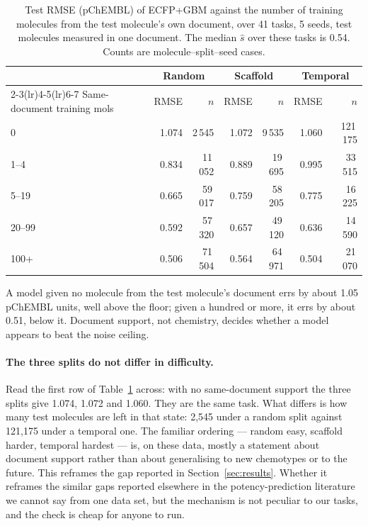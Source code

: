 \begin{table}[t]
\centering\small
\caption{Test RMSE (pChEMBL) of ECFP+GBM against the number of training molecules from the test molecule's own document, over 41 tasks, 5 seeds, test molecules measured in one document. The median $\hat s$ over these tasks is 0.54. Counts are molecule--split--seed cases.}
\label{tab:support}
\begin{tabular}{lrrrrrr}
\toprule
& \multicolumn{2}{c}{Random} & \multicolumn{2}{c}{Scaffold} & \multicolumn{2}{c}{Temporal} \\
\cmidrule(lr){2-3}\cmidrule(lr){4-5}\cmidrule(lr){6-7}
Same-document training mols & RMSE & $n$ & RMSE & $n$ & RMSE & $n$ \\
\midrule
0        & 1.074 & 2\,545  & 1.072 & 9\,535  & 1.060 & 121\,175 \\
1--4     & 0.834 & 11\,052 & 0.889 & 19\,695 & 0.995 & 33\,515 \\
5--19    & 0.665 & 59\,017 & 0.759 & 58\,205 & 0.775 & 16\,225 \\
20--99   & 0.592 & 57\,320 & 0.657 & 49\,120 & 0.636 & 14\,590 \\
100+     & 0.506 & 71\,504 & 0.564 & 64\,971 & 0.504 & 21\,070 \\
\bottomrule
\end{tabular}
\end{table}

A model given no molecule from the test molecule's document errs by about 1.05 pChEMBL units, well above the floor; given a hundred or more, it errs by about 0.51, below it. Document support, not chemistry, decides whether a model appears to beat the noise ceiling.

\paragraph{The three splits do not differ in difficulty.} Read the first row of Table~\ref{tab:support} across: with no same-document support the three splits give 1.074, 1.072 and 1.060. They are the same task. What differs is how many test molecules are left in that state: 2{,}545 under a random split against 121{,}175 under a temporal one. The familiar ordering --- random easy, scaffold harder, temporal hardest --- is, on these data, mostly a statement about document support rather than about generalising to new chemotypes or to the future. This reframes the gap reported in Section~\ref{sec:results}. Whether it reframes the similar gaps reported elsewhere in the potency-prediction literature we cannot say from one data set, but the mechanism is not peculiar to our tasks, and the check is cheap for anyone to run.

